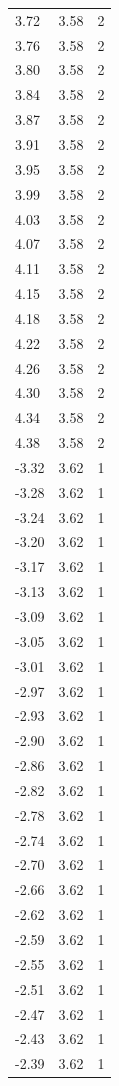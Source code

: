 \begin{longtable}{lrr}
  3.72 & 3.58 & 2 \\
  3.76 & 3.58 & 2 \\
  3.80 & 3.58 & 2 \\
  3.84 & 3.58 & 2 \\
  3.87 & 3.58 & 2 \\
  3.91 & 3.58 & 2 \\
  3.95 & 3.58 & 2 \\
  3.99 & 3.58 & 2 \\
  4.03 & 3.58 & 2 \\
  4.07 & 3.58 & 2 \\
  4.11 & 3.58 & 2 \\
  4.15 & 3.58 & 2 \\
  4.18 & 3.58 & 2 \\
  4.22 & 3.58 & 2 \\
  4.26 & 3.58 & 2 \\
  4.30 & 3.58 & 2 \\
  4.34 & 3.58 & 2 \\
  4.38 & 3.58 & 2 \\
  -3.32 & 3.62 & 1 \\
  -3.28 & 3.62 & 1 \\
  -3.24 & 3.62 & 1 \\
  -3.20 & 3.62 & 1 \\
  -3.17 & 3.62 & 1 \\
  -3.13 & 3.62 & 1 \\
  -3.09 & 3.62 & 1 \\
  -3.05 & 3.62 & 1 \\
  -3.01 & 3.62 & 1 \\
  -2.97 & 3.62 & 1 \\
  -2.93 & 3.62 & 1 \\
  -2.90 & 3.62 & 1 \\
  -2.86 & 3.62 & 1 \\
  -2.82 & 3.62 & 1 \\
  -2.78 & 3.62 & 1 \\
  -2.74 & 3.62 & 1 \\
  -2.70 & 3.62 & 1 \\
  -2.66 & 3.62 & 1 \\
  -2.62 & 3.62 & 1 \\
  -2.59 & 3.62 & 1 \\
  -2.55 & 3.62 & 1 \\
  -2.51 & 3.62 & 1 \\
  -2.47 & 3.62 & 1 \\
  -2.43 & 3.62 & 1 \\
  -2.39 & 3.62 & 1 \\

\end{longtable}
